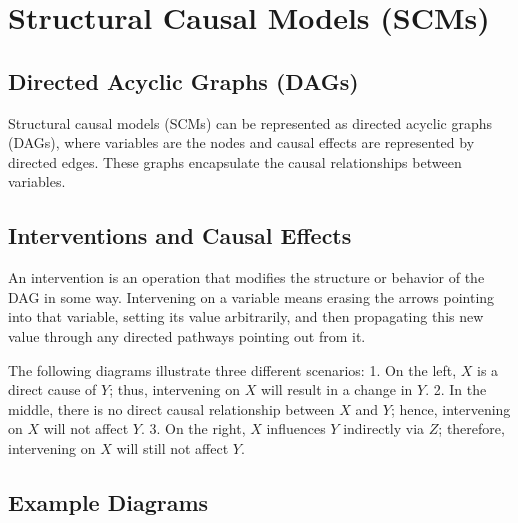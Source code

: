 \documentclass{article}
\begin{document}
\section*{Structural Causal Models (SCMs)}

\subsection*{Directed Acyclic Graphs (DAGs)}

Structural causal models (SCMs) can be represented as directed acyclic graphs (DAGs), where variables are the nodes and causal effects are represented by directed edges. These graphs encapsulate the causal relationships between variables.

\subsection*{Interventions and Causal Effects}

An intervention is an operation that modifies the structure or behavior of the DAG in some way. Intervening on a variable means erasing the arrows pointing into that variable, setting its value arbitrarily, and then propagating this new value through any directed pathways pointing out from it.

The following diagrams illustrate three different scenarios:
1. On the left, \( X \) is a direct cause of \( Y \); thus, intervening on \( X \) will result in a change in \( Y \).
2. In the middle, there is no direct causal relationship between \( X \) and \( Y \); hence, intervening on \( X \) will not affect \( Y \).
3. On the right, \( X \) influences \( Y \) indirectly via \( Z \); therefore, intervening on \( X \) will still not affect \( Y \).

\subsection*{Example Diagrams}
\end{document}
